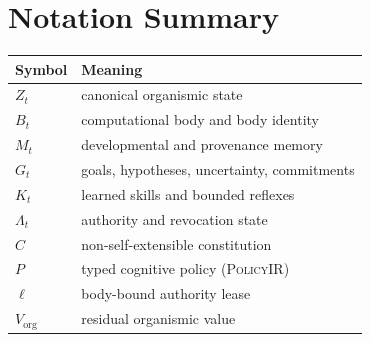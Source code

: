 \documentclass[journal,10pt]{IEEEtran}
\newcommand{\PolicyIR}{\textsc{PolicyIR}}
\begin{document}
\section{Notation Summary}
\begin{table}[t]
\centering
\small
\begin{tabular}{@{}ll@{}}
\toprule
Symbol & Meaning \\
\midrule
$Z_t$ & canonical organismic state \\
$B_t$ & computational body and body identity \\
$M_t$ & developmental and provenance memory \\
$G_t$ & goals, hypotheses, uncertainty, commitments \\
$K_t$ & learned skills and bounded reflexes \\
$\Lambda_t$ & authority and revocation state \\
$C$ & non-self-extensible constitution \\
$P$ & typed cognitive policy (\PolicyIR{}) \\
$\ell$ & body-bound authority lease \\
$V_{\mathrm{org}}$ & residual organismic value \\
\bottomrule
\end{tabular}
\end{table}

\renewcommand*{\bibfont}{\footnotesize}
\printbibliography
\end{document}
